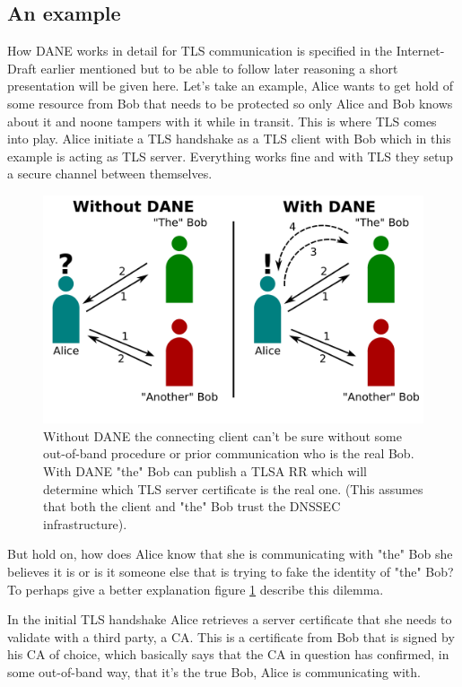 \subsection{An example}
How DANE works in detail for TLS communication is specified in the Internet-Draft earlier mentioned\cite{rfc:draft-dane} but to be able to follow later reasoning a short presentation will be given here.
Let's take an example, Alice wants to get hold of some resource from Bob that needs to be protected so only Alice and Bob knows about it and noone tampers with it while in transit.
This is where TLS comes into play.
Alice initiate a TLS handshake as a TLS client with Bob which in this example is acting as TLS server. 
Everything works fine and with TLS they setup a secure channel between themselves.

\begin{figure}[ht]
\begin{center}
\includegraphics[scale=1]{Figures/daneWithAndWithoutDane.png}
\end{center}
\caption{Without DANE the connecting client can't be sure without some out-of-band procedure or prior communication who is the real Bob. With DANE "the" Bob can publish a TLSA RR which will determine which TLS server certificate is the real one. (This assumes that both the client and "the" Bob trust the DNSSEC infrastructure).\label{ch3:daneWithAndWithoutDane}}
\end{figure}


But hold on, how does Alice know that she is communicating with "the" Bob she believes it is or is it someone else that is trying to fake the identity of "the" Bob?
To perhaps give a better explanation figure \ref{ch3:daneWithAndWithoutDane} describe this dilemma.

In the initial TLS handshake Alice retrieves a server certificate that she needs to validate with a third party, a CA.
This is a certificate from Bob that is signed by his CA of choice, which basically says that the CA in question has confirmed, in some out-of-band way, that it's the true Bob, Alice is communicating with.

